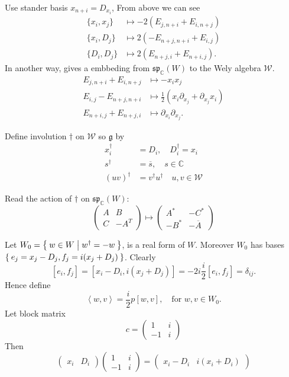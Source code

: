 \documentclass[12pt]{amsart}
\def\bC{{\mathbb{C}}}
\def\sp{{\mathfrak{sp}}}
\def\inn#1#2{\left\langle{#1},{#2}\right\rangle}
\def\fgg{\mathfrak{g}}
\def\cww{\mathcal{W}}
\begin{document}
Use stander basis $x_{n+i} = D_{x_i}$,
From above we can see
\begin{align}
\{x_i,x_j\} &\mapsto -2 (E_{j,n+i} + E_{i,n+j})\\
\{x_i,D_j\} &\mapsto 2 (-E_{n+j,n+i}+E_{i,j})\\
\{D_i,D_j\} &\mapsto 2(E_{n+j,i}+E_{n+i,j}).
\end{align}
In another way, gives a embbeding from $\sp_\bC(W)$ to the Wely algebra $\cww$.
\begin{align}
E_{j,n+i}+E_{i,n+j} &\mapsto -x_ix_j\\
E_{i,j} - E_{n+j,n+i} &\mapsto \frac{1}{2}(x_i\partial_{x_j}+ \partial_{x_j} x_i) \\
E_{n+i,j}+ E_{n+j,i} &\mapsto \partial_{x_i}\partial_{x_j}.
\end{align}

Define involution $\dagger$ on $\cww$ so $\fgg$ by 
\begin{align*}
x_i^\dagger &= D_i,  \quad D_i^\dagger = x_i\\
s^\dagger & = \overline{s}, \quad s\in \bC \\
(uv)^\dagger &= v^\dagger u^\dagger \quad u,v\in \cww
\end{align*}


Read the action of $\dagger$ on $\sp_\bC(W)$:
\[
\begin{pmatrix}
A & B\\
C & -A^T
\end{pmatrix}
\mapsto
\begin{pmatrix}
A^* & -C^*\\
-B^* & -\overline{A}
\end{pmatrix}
\]

Let $W_0 = \Set{w\in W|w^\dagger = -w}$, is a real form of $W$.
Moreover $W_0$ has bases $\Set{e_j = x_j-D_j, f_j = i(x_j+D_j)}$. 
Clearly 
\[
[e_i,f_j] = [x_i-D_i,i(x_j+D_j)] = -2i
\frac{i}{2} [e_i,f_j] = \delta_{ij}.
\]
Hence define 
\[
\inn{w}{v} = \frac{i}{2}p[w,v], \quad \text{for } w,v\in W_0.
\] 
Let block matrix 
\[
c=\begin{pmatrix}
1 & i\\
-1 & i
\end{pmatrix}
\]
Then 
\[
\begin{pmatrix}
x_i & D_i
\end{pmatrix}
\begin{pmatrix}
1 & i\\
-1 & i
\end{pmatrix}
= 
\begin{pmatrix}
x_i-D_i & i(x_i + D_i)
\end{pmatrix}
\]
\end{document}
